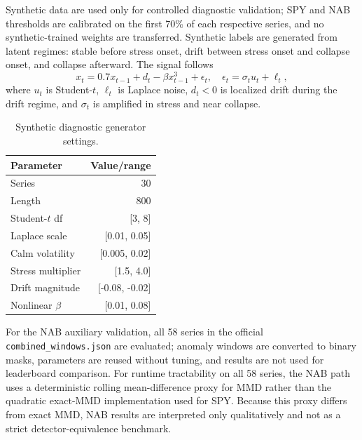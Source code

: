 \documentclass[10pt,twocolumn]{article}
\begin{document}
Synthetic data are used only for controlled diagnostic validation; SPY and NAB thresholds are calibrated on the first 70\% of each respective series, and no synthetic-trained weights are transferred. Synthetic labels are generated from latent regimes: stable before stress onset, drift between stress onset and collapse onset, and collapse afterward. The signal follows
\begin{equation}
x_t=0.7x_{t-1}+d_t-\beta x_{t-1}^3+\epsilon_t,\quad
\epsilon_t=\sigma_t u_t+\ell_t,
\end{equation}
where $u_t$ is Student-$t$, $\ell_t$ is Laplace noise, $d_t<0$ is localized drift during the drift regime, and $\sigma_t$ is amplified in stress and near collapse.

\begin{table}[t]
\centering
\caption{Synthetic diagnostic generator settings.}
\label{tab:synthetic_params}
\scriptsize
\begin{tabular}{lr}
\toprule
Parameter & Value/range\\
\midrule
Series & 30\\
Length & 800\\
Student-$t$ df & [3, 8]\\
Laplace scale & [0.01, 0.05]\\
Calm volatility & [0.005, 0.02]\\
Stress multiplier & [1.5, 4.0]\\
Drift magnitude & [-0.08, -0.02]\\
Nonlinear $\beta$ & [0.01, 0.08]\\
\bottomrule
\end{tabular}
\end{table}

For the NAB auxiliary validation, all 58 series in the official \texttt{combined\_windows.json} are evaluated; anomaly windows are converted to binary masks, parameters are reused without tuning, and results are not used for leaderboard comparison. For runtime tractability on all 58 series, the NAB path uses a deterministic rolling mean-difference proxy for MMD rather than the quadratic exact-MMD implementation used for SPY. Because this proxy differs from exact MMD, NAB results are interpreted only qualitatively and not as a strict detector-equivalence benchmark.
\end{document}
